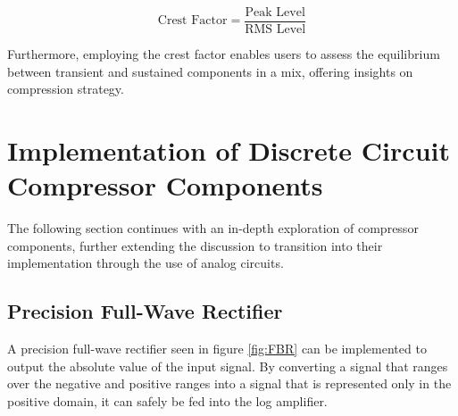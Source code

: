 \documentclass[10pt]{article}
\begin{document}
\begin{multicols*}{2}
                    \begin{equation}
                        \text{Crest Factor} = \frac{\text{Peak Level}}{\text{RMS Level}}
                    \end{equation}

                \noindent Furthermore, employing the crest factor enables users to assess the equilibrium between transient and sustained components in a mix, offering insights on compression strategy.                
            
        \section{Implementation of Discrete Circuit Compressor Components}
            The following section continues with an in-depth exploration of compressor components, further extending the discussion to transition into their implementation through the use of analog circuits.

            \subsection{Precision Full-Wave Rectifier}
                A precision full-wave rectifier seen in figure \ref{fig:FBR} can be implemented to output the absolute value of the input signal. By converting a signal that ranges over the negative and positive ranges into a signal that is represented only in the positive domain, it can safely be fed into the log amplifier.

                                \begin{figure}[!t]
                                    \centering
\end{figure}
\end{multicols*}
\end{document}
